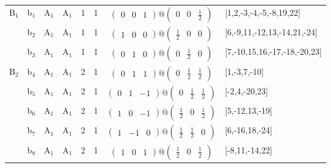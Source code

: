 \documentclass[fleqn,10pt,landscape]{article}
\begin{document}
\begin{itemize}
\begin{center}
\begin{longtable}{cc|cc|c|c|c|l}
B$_{1}$ & b$_{1}$ & A$_{1}$ & A$_{1}$ & 1 & 1 & $\begin{pmatrix} 0 & 0 & 1 \end{pmatrix}@\begin{pmatrix} 0 & 0 & \frac{1}{2} \end{pmatrix}$ & [1,2,-3,-4,-5,-8,19,22] \\
& b$_{2}$ & A$_{1}$ & A$_{1}$ & 1 & 1 & $\begin{pmatrix} 1 & 0 & 0 \end{pmatrix}@\begin{pmatrix} \frac{1}{2} & 0 & 0 \end{pmatrix}$ & [6,-9,11,-12,13,-14,21,-24] \\
& b$_{3}$ & A$_{1}$ & A$_{1}$ & 1 & 1 & $\begin{pmatrix} 0 & 1 & 0 \end{pmatrix}@\begin{pmatrix} 0 & \frac{1}{2} & 0 \end{pmatrix}$ & [7,-10,15,16,-17,-18,-20,23] \\ \hline
B$_{2}$ & b$_{4}$ & A$_{1}$ & A$_{1}$ & 2 & 1 & $\begin{pmatrix} 0 & 1 & 1 \end{pmatrix}@\begin{pmatrix} 0 & \frac{1}{2} & \frac{1}{2} \end{pmatrix}$ & [1,-3,7,-10] \\
& b$_{5}$ & A$_{1}$ & A$_{1}$ & 2 & 1 & $\begin{pmatrix} 0 & 1 & -1 \end{pmatrix}@\begin{pmatrix} 0 & \frac{1}{2} & \frac{1}{2} \end{pmatrix}$ & [-2,4,-20,23] \\
& b$_{6}$ & A$_{1}$ & A$_{1}$ & 2 & 1 & $\begin{pmatrix} 1 & 0 & -1 \end{pmatrix}@\begin{pmatrix} \frac{1}{2} & 0 & \frac{1}{2} \end{pmatrix}$ & [5,-12,13,-19] \\
& b$_{7}$ & A$_{1}$ & A$_{1}$ & 2 & 1 & $\begin{pmatrix} 1 & -1 & 0 \end{pmatrix}@\begin{pmatrix} \frac{1}{2} & \frac{1}{2} & 0 \end{pmatrix}$ & [6,-16,18,-24] \\
& b$_{8}$ & A$_{1}$ & A$_{1}$ & 2 & 1 & $\begin{pmatrix} 1 & 0 & 1 \end{pmatrix}@\begin{pmatrix} \frac{1}{2} & 0 & \frac{1}{2} \end{pmatrix}$ & [-8,11,-14,22] \\

\end{longtable}
\end{center}
\end{itemize}
\end{document}
